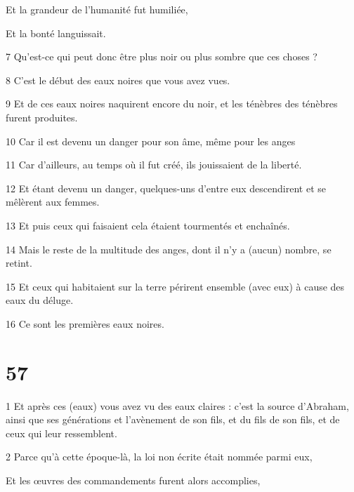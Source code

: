\par Et la grandeur de l'humanité fut humiliée,

\par Et la bonté languissait.

\par 7 Qu'est-ce qui peut donc être plus noir ou plus sombre que ces choses ?

\par 8 C'est le début des eaux noires que vous avez vues.

\par 9 Et de ces eaux noires naquirent encore du noir, et les ténèbres des ténèbres furent produites.

\par 10 Car il est devenu un danger pour son âme, même pour les anges

\par 11 Car d'ailleurs, au temps où il fut créé, ils jouissaient de la liberté.

\par 12 Et étant devenu un danger, quelques-uns d'entre eux descendirent et se mêlèrent aux femmes.

\par 13 Et puis ceux qui faisaient cela étaient tourmentés et enchaînés.

\par 14 Mais le reste de la multitude des anges, dont il n'y a (aucun) nombre, se retint.

\par 15 Et ceux qui habitaient sur la terre périrent ensemble (avec eux) à cause des eaux du déluge.

\par 16 Ce sont les premières eaux noires.

\chapter{57}

\par 1 Et après ces (eaux) vous avez vu des eaux claires : c'est la source d'Abraham, ainsi que ses générations et l'avènement de son fils, et du fils de son fils, et de ceux qui leur ressemblent.

\par 2 Parce qu'à cette époque-là, la loi non écrite était nommée parmi eux,

\par Et les œuvres des commandements furent alors accomplies,


